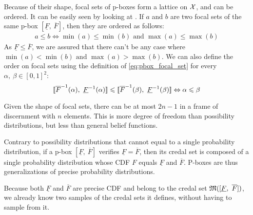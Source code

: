 Because of their shape, focal sets of p-boxes form a lattice on $\mathcal{X}$, and can be ordered. It can be easily seen by looking at . If $a$ and $b$ are two focal sets of the same p-box $[\underline{F}, ~\overline{F}]$, then they are ordered as follows:
\begin{align}
    a\leqslant b \Leftrightarrow \min(a)\leqslant\min(b) \text{ and } \max(a)\leqslant \max(b)
\end{align}
As $\underline{F}\leqslant\overline{F}$, we are assured that there can't be any case where $\min(a)<\min(b) \text{ and } \max(a)> \max(b)$. We can also define the order on focal sets using the definition of \cref{eq:pbox_focal_set} for every $\alpha,~\beta\in[0,1]^2$:
\begin{align*}
    [\![\overline{F}^{-1}(\alpha), ~\underline{F}^{-1}(\alpha)]\!] \leqslant [\![\overline{F}^{-1}(\beta), ~\underline{F}^{-1}(\beta)]\!] \Leftrightarrow \alpha\leqslant\beta
\end{align*}

Given the shape of focal sets, there can be at most $2n-1$ in a frame of discernment with $n$ elements. This is more degree of freedom than possibility distributions, but less than general belief functions.
\begin{remark}
    Contrary to possibility distributions that cannot equal to a single probability distribution, if a p-box $[\underline{F}, ~\overline{F}]$ verifies $\underline{F}=\overline{F}$, then its credal set is composed of a single probability distribution whose CDF $F$ equals $\underline{F}$ and $\overline{F}$. P-boxes are thus generalizations of precise probability distributions.
    
    Because both $\underline{F}$ and $\overline{F}$ are precise CDF and belong to the credal set $\mathfrak{M}([\underline{F}, ~\overline{F}])$, we already know two samples of the credal sets it defines, without having to sample from it.
\end{remark}

